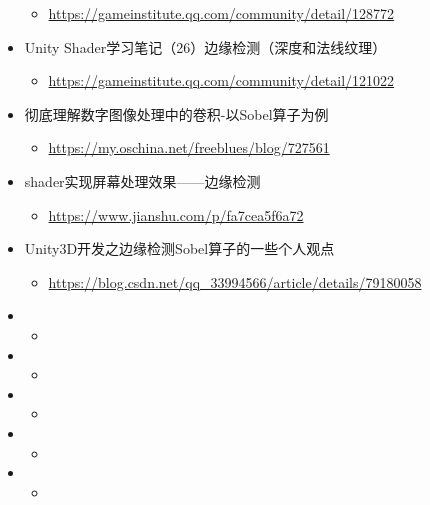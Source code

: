 \documentclass[9pt, b5paper]{article}
\begin{document}
\begin{itemize}
\begin{itemize}
\item \url{https://gameinstitute.qq.com/community/detail/128772}
\end{itemize}
\item Unity Shader学习笔记（26）边缘检测（深度和法线纹理）
\begin{itemize}
\item \url{https://gameinstitute.qq.com/community/detail/121022}
\end{itemize}
\item 彻底理解数字图像处理中的卷积-以Sobel算子为例
\begin{itemize}
\item \url{https://my.oschina.net/freeblues/blog/727561}
\end{itemize}
\item shader实现屏幕处理效果——边缘检测
\begin{itemize}
\item \url{https://www.jianshu.com/p/fa7cea5f6a72}
\end{itemize}
\item Unity3D开发之边缘检测Sobel算子的一些个人观点
\begin{itemize}
\item \url{https://blog.csdn.net/qq_33994566/article/details/79180058}
\end{itemize}
\item \begin{itemize}
\item 
\end{itemize}
\item \begin{itemize}
\item 
\end{itemize}
\item \begin{itemize}
\item 
\end{itemize}
\item \begin{itemize}
\item 
\end{itemize}
\item \begin{itemize}
\item 
\end{itemize}
\end{itemize}
\end{document}
